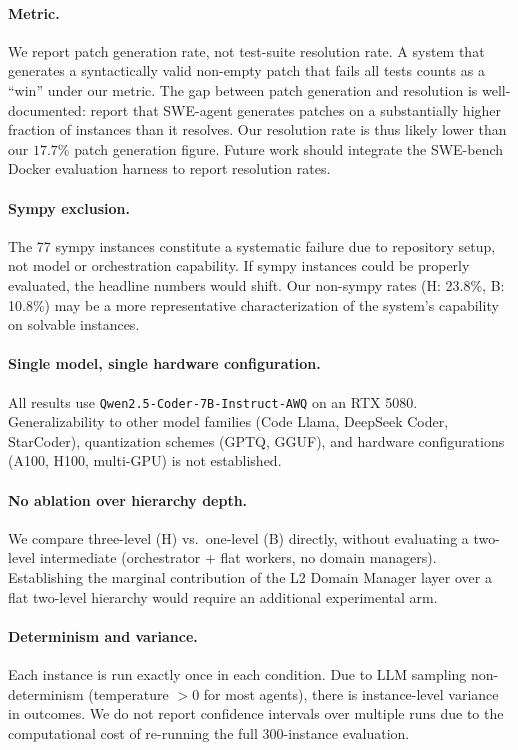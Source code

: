 \paragraph{Metric.}
We report patch generation rate, not test-suite resolution rate. A system
that generates a syntactically valid non-empty patch that fails all tests
counts as a ``win'' under our metric. The gap between patch generation and
resolution is well-documented: \citet{yang2024sweagent} report that
SWE-agent generates patches on a substantially higher fraction of instances
than it resolves. Our resolution rate is thus likely lower than our $17.7\%$
patch generation figure. Future work should integrate the SWE-bench Docker
evaluation harness to report resolution rates.

\paragraph{Sympy exclusion.}
The 77 sympy instances constitute a systematic failure due to repository
setup, not model or orchestration capability. If sympy instances could be
properly evaluated, the headline numbers would shift. Our non-sympy rates
(H: 23.8\%, B: 10.8\%) may be a more representative characterization of
the system's capability on solvable instances.

\paragraph{Single model, single hardware configuration.}
All results use \texttt{Qwen2.5-Coder-7B-Instruct-AWQ} on an RTX 5080.
Generalizability to other model families (Code Llama, DeepSeek Coder,
StarCoder), quantization schemes (GPTQ, GGUF), and hardware configurations
(A100, H100, multi-GPU) is not established.

\paragraph{No ablation over hierarchy depth.}
We compare three-level (H) vs.\ one-level (B) directly, without evaluating
a two-level intermediate (orchestrator + flat workers, no domain managers).
Establishing the marginal contribution of the L2 Domain Manager layer over
a flat two-level hierarchy would require an additional experimental arm.

\paragraph{Determinism and variance.}
Each instance is run exactly once in each condition. Due to LLM sampling
non-determinism (temperature $> 0$ for most agents), there is instance-level
variance in outcomes. We do not report confidence intervals over multiple
runs due to the computational cost of re-running the full 300-instance
evaluation.

